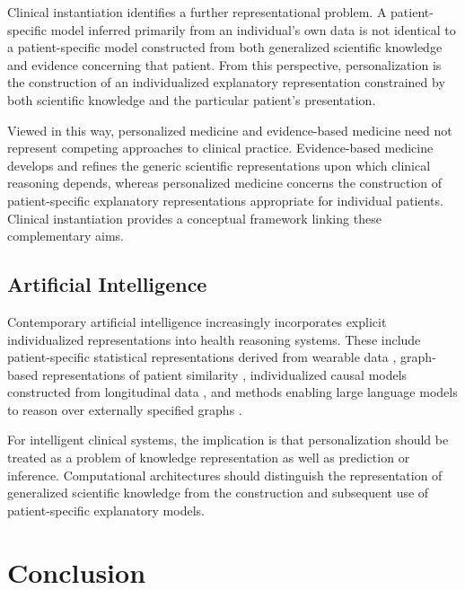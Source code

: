 \documentclass[11pt]{article}
\begin{document}
Clinical instantiation identifies a further representational problem. A patient-specific model inferred primarily from an individual's own data is not identical to a patient-specific model constructed from both generalized scientific knowledge and evidence concerning that patient. From this perspective, personalization is the construction of an individualized explanatory representation constrained by both scientific knowledge and the particular patient's presentation.

Viewed in this way, personalized medicine and evidence-based medicine need not represent competing approaches to clinical practice. Evidence-based medicine develops and refines the generic scientific representations upon which clinical reasoning depends, whereas personalized medicine concerns the construction of patient-specific explanatory representations appropriate for individual patients. Clinical instantiation provides a conceptual framework linking these complementary aims.

\subsection{Artificial Intelligence}

Contemporary artificial intelligence increasingly incorporates explicit individualized representations into health reasoning systems. These include patient-specific statistical representations derived from wearable data \parencite{fang_physiollm_2024}, graph-based representations of patient similarity \parencite{subramanian_graph-augmented_2024}, individualized causal models constructed from longitudinal data \parencite{yang_chatdiet_2024,yang_personalized_2025}, and methods enabling large language models to reason over externally specified graphs \parencite{luo_reasoning_2024}.

For intelligent clinical systems, the implication is that personalization should be treated as a problem of knowledge representation as well as prediction or inference. Computational architectures should distinguish the representation of generalized scientific knowledge from the construction and subsequent use of patient-specific explanatory models.

\section{Conclusion}
\end{document}
